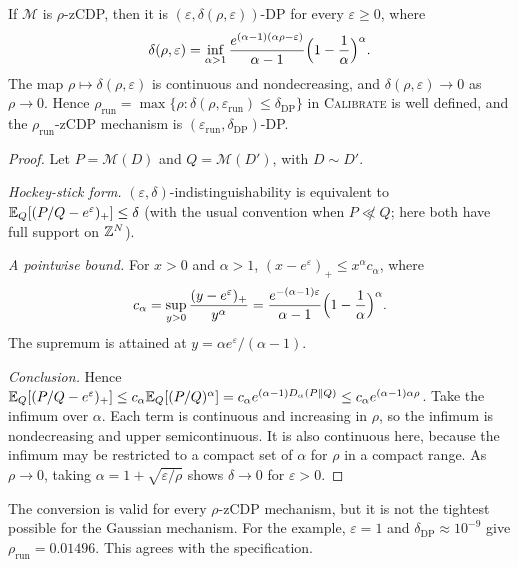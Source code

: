 \begin{proposition}\label{prop:conv}
If $\mathcal M$ is $\rho$-zCDP, then it is $(\varepsilon,\delta(\rho,\varepsilon))$-DP for every $\varepsilon\ge0$, where
\[
  \delta(\rho,\varepsilon)=\inf_{\alpha>1}\frac{e^{(\alpha-1)(\alpha\rho-\varepsilon)}}{\alpha-1}\Bigl(1-\frac1\alpha\Bigr)^{\alpha}.
\]
The map $\rho\mapsto\delta(\rho,\varepsilon)$ is continuous and nondecreasing, and $\delta(\rho,\varepsilon)\to0$ as $\rho\to0$. Hence $\rho_{\mathrm{run}}=\max\{\rho:\delta(\rho,\varepsilon_{\mathrm{run}})\le\delta_{\mathrm{DP}}\}$ in \textsc{Calibrate} is well defined, and the $\rho_{\mathrm{run}}$-zCDP mechanism is $(\varepsilon_{\mathrm{run}},\delta_{\mathrm{DP}})$-DP.
\end{proposition}
\begin{proof}
Let $P=\mathcal M(D)$ and $Q=\mathcal M(D')$, with $D\sim D'$.

\emph{Hockey-stick form.} $(\varepsilon,\delta)$-indistinguishability is equivalent to $\mathbb{E}_Q[(P/Q-e^\varepsilon)_+]\le\delta$ (with the usual convention when $P\not\ll Q$; here both have full support on $\mathbb{Z}^N$).

\emph{A pointwise bound.} For $x>0$ and $\alpha>1$, $(x-e^\varepsilon)_+\le x^\alpha c_\alpha$, where
\[
  c_\alpha=\sup_{y>0}\frac{(y-e^\varepsilon)_+}{y^\alpha}=\frac{e^{-(\alpha-1)\varepsilon}}{\alpha-1}\Bigl(1-\frac1\alpha\Bigr)^\alpha .
\]
The supremum is attained at $y=\alpha e^\varepsilon/(\alpha-1)$.

\emph{Conclusion.} Hence $\mathbb{E}_Q[(P/Q-e^\varepsilon)_+]\le c_\alpha\mathbb{E}_Q[(P/Q)^\alpha]=c_\alpha e^{(\alpha-1)D_\alpha(P\Vert Q)}\le c_\alpha e^{(\alpha-1)\alpha\rho}$. Take the infimum over $\alpha$. Each term is continuous and increasing in $\rho$, so the infimum is nondecreasing and upper semicontinuous. It is also continuous here, because the infimum may be restricted to a compact set of $\alpha$ for $\rho$ in a compact range. As $\rho\to0$, taking $\alpha=1+\sqrt{\varepsilon/\rho}$ shows $\delta\to0$ for $\varepsilon>0$.
\end{proof}

\begin{remark}
The conversion is valid for every $\rho$-zCDP mechanism, but it is not the tightest possible for the Gaussian mechanism. For the example, $\varepsilon=1$ and $\delta_{\mathrm{DP}}\approx10^{-9}$ give $\rho_{\mathrm{run}}=0.01496$. This agrees with the specification.
\end{remark}

